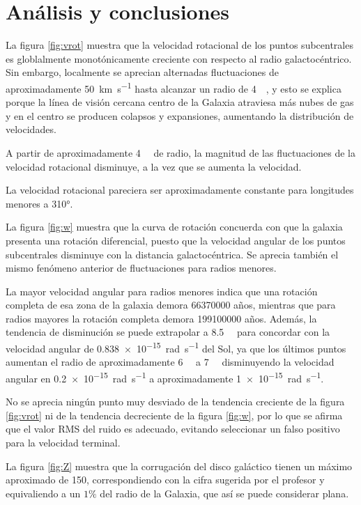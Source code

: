 \section{Análisis y conclusiones}

La figura \ref{fig:vrot} muestra que la velocidad rotacional de los puntos subcentrales es globlalmente monotónicamente creciente con respecto al radio galactocéntrico. Sin embargo, localmente se aprecian alternadas fluctuaciones de aproximadamente \SI{50}{\kilo\metre\per\second} hasta alcanzar un radio de \SI{4}{\kilo\parsec}, y esto se explica porque la línea de visión cercana centro de la Galaxia atraviesa más nubes de gas y en el centro se producen colapsos y expansiones, aumentando la distribución de velocidades.

A partir de aproximadamente \SI{4}{\kilo\parsec} de radio, la magnitud de las fluctuaciones de la velocidad rotacional disminuye, a la vez que se aumenta la velocidad.

La velocidad rotacional pareciera ser aproximadamente constante para longitudes menores a \ang{310}.

La figura \ref{fig:w} muestra que la curva de rotación concuerda con que la galaxia presenta una rotación diferencial, puesto que la velocidad angular de los puntos subcentrales disminuye con la distancia galactocéntrica. Se aprecia también el mismo fenómeno anterior de fluctuaciones para radios menores.

La mayor velocidad angular para radios menores indica que una rotación completa de esa zona de la galaxia demora 66370000 años, mientras que para radios mayores la rotación completa demora 199100000 años. Además, la tendencia de disminución se puede extrapolar a \SI{8.5}{\kilo\parsec} para concordar con la velocidad angular de \SI{0.838e-15}{\radian\per\second} del Sol, ya que los últimos puntos aumentan el radio de aproximadamente \SI{6}{\kilo\parsec} a \SI{7}{\kilo\parsec} disminuyendo la velocidad angular en \SI{0.2e-15}{\radian\per\second} a aproximadamente \SI{1e-15}{\radian\per\second}.

No se aprecia ningún punto muy desviado de la tendencia creciente de la figura \ref{fig:vrot} ni de la tendencia decreciente de la figura \ref{fig:w}, por lo que se afirma que el valor RMS del ruido es adecuado, evitando seleccionar un falso positivo para la velocidad terminal.

La figura \ref{fig:Z} muestra que la corrugación del disco galáctico tienen un máximo aproximado de \SI{150}{\parsec}, correspondiendo con la cifra sugerida por el profesor y equivaliendo a un $1\%$ del radio de la Galaxia, que así se puede considerar plana.

